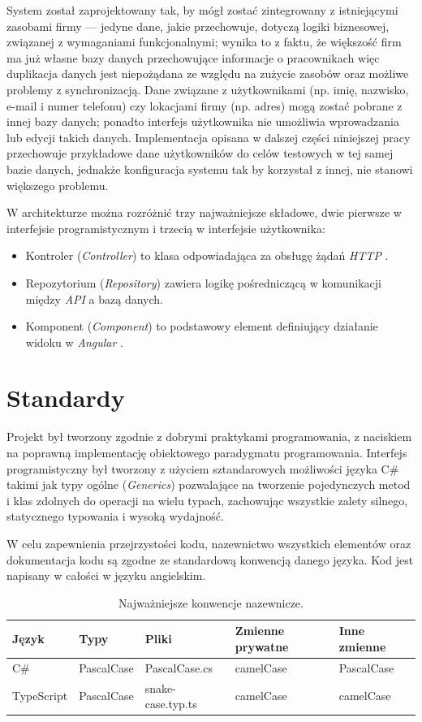 \documentclass[eng,printmode,openany]{mgr}
\begin{document}
	System został zaprojektowany tak, by mógł zostać zintegrowany z istniejącymi zasobami firmy — jedyne dane, jakie przechowuje, dotyczą logiki biznesowej, związanej z wymaganiami funkcjonalnymi; wynika to z faktu, że większość firm ma już własne bazy danych przechowujące informacje o pracownikach więc duplikacja danych jest niepożądana ze względu na zużycie zasobów oraz możliwe problemy z synchronizacją. Dane związane z użytkownikami (np. imię, nazwisko, e-mail i numer telefonu) czy lokacjami firmy (np. adres) mogą zostać pobrane z innej bazy danych; ponadto interfejs użytkownika nie umożliwia wprowadzania lub edycji takich danych. Implementacja opisana w dalszej części niniejszej pracy przechowuje przykładowe dane użytkowników do celów testowych w tej samej bazie danych, jednakże konfiguracja systemu tak by korzystał z innej, nie stanowi większego problemu.
	
	W architekturze można rozróżnić trzy najważniejsze składowe, dwie pierwsze w interfejsie programistycznym i trzecią w interfejsie użytkownika:
	\begin{itemize}
		\item Kontroler (\textit{Controller}) to klasa odpowiadająca za obsługę żądań \textit{HTTP} \cite{msdn-aspnet-api}.
		\item Repozytorium (\textit{Repository}) zawiera logikę pośredniczącą w komunikacji między \textit{API} a bazą danych.
		\item Komponent (\textit{Component}) to podstawowy element definiujący działanie widoku w \textit{Angular} \cite{angular-components}.
	\end{itemize}
	
	\section{Standardy}
	Projekt był tworzony zgodnie z dobrymi praktykami programowania, z naciskiem na poprawną implementację obiektowego paradygmatu programowania. Interfejs programistyczny był tworzony z użyciem sztandarowych możliwości języka C\# takimi jak typy ogólne \cite{msdn-generics} (\textit{Generics}) pozwalające na tworzenie pojedynczych metod i klas zdolnych do operacji na wielu typach, zachowując wszystkie zalety silnego, statycznego typowania i wysoką wydajność.
	
	W celu zapewnienia przejrzystości kodu, nazewnictwo wszystkich elementów oraz dokumentacja kodu są zgodne ze standardową konwencją danego języka. Kod jest napisany w całości w języku angielskim.
	\begin{table}[H]
		\caption{Najważniejsze konwencje nazewnicze.}
		\begin{tabularx}{\textwidth}{|l|l|l|l|X|}
			\hline
			Język      & Typy       			& Pliki                 & Zmienne prywatne & Inne zmienne \\ \hline
			C\# \cite{msdn-gnc}     & PascalCase & PascalCase.cs   		& camelCase        & PascalCase   \\ \hline
			TypeScript \cite{angular-sg} & PascalCase & snake-case.typ.ts 	& camelCase        & camelCase    \\ \hline
		\end{tabularx}
	\end{table}
	
\end{document}
